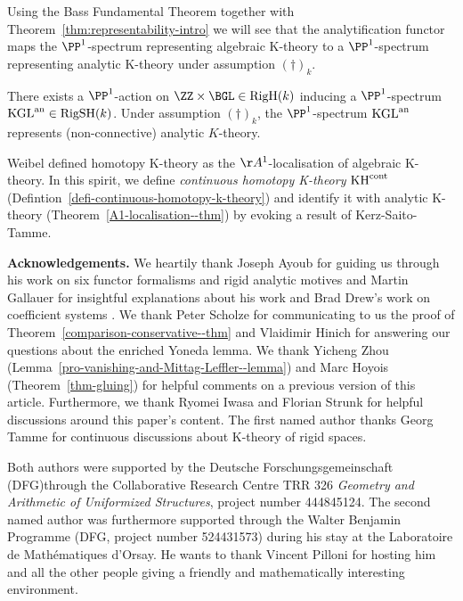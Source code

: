 \documentclass[colorinlistoftodos,article,11pt,reqno]{article}
\newcommand{\RigSH}{\textup{RigSH}}
\newcommand{\RigH}{\textup{RigH}}
\newcommand{\an}{\textup{an}}
\newcommand{\KHcont}{\textup{KH}^\textup{cont}}
\newcommand{\Arig}{\AA^{1}}
\begin{document}
Using the Bass Fundamental Theorem together with Theorem~\ref{thm:representability-intro} we will see that the analytification functor maps the $\PP^1$-spectrum  representing algebraic K-theory to a $\PP^1$-spectrum representing analytic K-theory under assumption $(\dagger)_k$. 

\begin{intro-corollary}[\protect{\ref{cor-K-P1-spectrum}}]
There exists a $\PP^1$-action on $\ZZ\times\BGL\in\RigH(k)$ inducing a $\PP^1$-spectrum $\textup{KGL}^{\an}\in \RigSH(k)$. Under assumption $(\dagger)_k$, the $\PP^1$\hyp{}spectrum $\textup{KGL}^{\an}$ represents (non\hyp{}connective) analytic $K$\hyp{}theory.
\end{intro-corollary}


\vspace{6pt}\noindent
Weibel defined homotopy K-theory as the $\Arig$-localisation of algebraic K-theory. In this spirit, we define \emph{continuous homotopy K-theory} $\KHcont$ (Defintion~\ref{defi-continuous-homotopy-k-theory}) and identify it with analytic K-theory (Theorem~\ref{A1-localisation--thm}) by evoking a result of Kerz-Saito-Tamme.



\vspace{6pt}\noindent\textbf{Acknowledgements.}
We heartily thank Joseph Ayoub for guiding us through his work on six functor formalisms \cite{AyoubThesis} and rigid analytic motives \cite{AyoubRig} and Martin Gallauer for insightful explanations about his work \cite{AGV} and Brad Drew's work on coefficient systems \cite{DrewMHM}. We thank Peter Scholze for communicating to us the proof of Theorem~\ref{comparison-conservative--thm} and Vlaidimir Hinich for answering our questions about the enriched Yoneda lemma.
We thank Yicheng Zhou (Lemma~\ref{pro-vanishing-and-Mittag-Leffler--lemma}) and Marc Hoyois (Theorem~\ref{thm-gluing}) for helpful comments on a previous version of this article.
Furthermore, we thank Ryomei Iwasa and Florian Strunk for helpful discussions around this paper's content. The first named author thanks Georg Tamme for continuous discussions about K-theory of rigid spaces.

Both authors were supported by the Deutsche Forschungsgemeinschaft (DFG)\linebreak through the Collaborative Research Centre TRR 326 \textit{Geometry and Arithmetic of Uniformized Structures}, project number 444845124. The second named author was furthermore supported through the Walter Benjamin Programme (DFG, project number 524431573) during his stay at the Laboratoire de Mathématiques d'Orsay. He wants to thank Vincent Pilloni for hosting him and all the other people giving a friendly and mathematically interesting environment.
\end{document}
